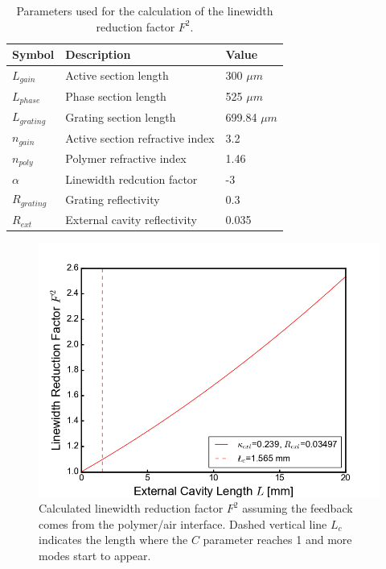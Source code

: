 \begin{table}[ht]
    \centering
    \caption{Parameters used for the calculation of the linewidth reduction factor $F^2$.}
    \begin{tabular}{@{}lll@{}}
    \toprule
    Symbol        & Description                  & Value           \\ \midrule
    $L_{gain}$    & Active section length        & 300 $\mu m$     \\
    $L_{phase}$   & Phase section length         & 525 $\mu m$     \\
    $L_{grating}$ & Grating section length       & 699.84 $\mu m$  \\
    $n_{gain}$    & Active section refractive index  & 3.2         \\
    $n_{poly}$    & Polymer refractive index     & 1.46            \\
    $\alpha$      & Linewidth redcution factor   & -3              \\
    $R_{grating}$ & Grating reflectivity         & 0.3             \\
    $R_{ext}$     & External cavity reflectivity & 0.035           \\ \bottomrule
    \end{tabular}
    \label{tab:F_reduction_factor}
\end{table}

\begin{figure}[ht]
    \centering
    \includegraphics[width=.7\linewidth]{figures/F_reduction_factor.png}
    \caption{Calculated linewidth reduction factor $F^2$ assuming the feedback comes from the polymer/air interface. Dashed vertical line $L_c$ indicates the length where the $C$ parameter reaches 1 and more modes start to appear.}
    \label{fig:F_reduction_factor}
\end{figure}

